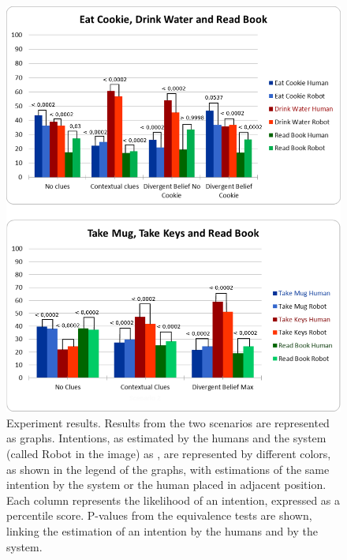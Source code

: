  \begin{figure}[ht!]
	\centering
	\includegraphics[clip,scale=0.5]{img/observer/pvalues1.pdf}
	\caption[Experiment results]{Experiment results. Results from the two scenarios are represented as graphs. Intentions, as estimated by the humans and the system (called Robot in the image) as , are represented by different colors, as shown in the legend of the graphs, with estimations of the same intention by the system or the human placed in adjacent position. Each column represents the likelihood of an intention, expressed as a percentile score. P-values from the equivalence tests are shown, linking the estimation of an intention by the humans and by the system.}
	\label{fig:observer_experiments-user_study_results}
\end{figure}




